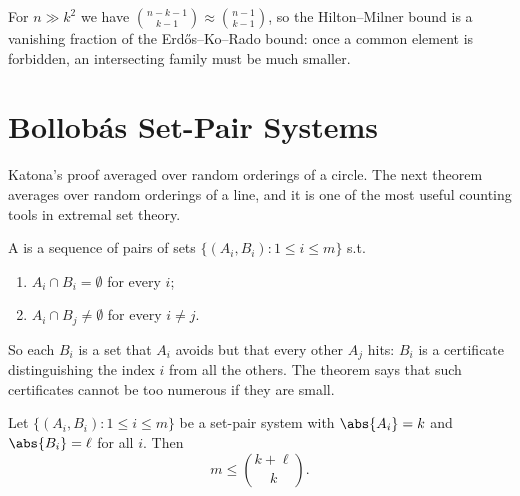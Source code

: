 \begin{remark}
    For \(n \gg k^2\) we have \(\binom{n-k-1}{k-1} \approx \binom{n-1}{k-1}\), so the Hilton--Milner bound is a vanishing fraction of the Erd\H{o}s--Ko--Rado bound: once a common element is forbidden, an intersecting family must be much smaller.
\end{remark}


\section{Bollob\'as Set-Pair Systems}\label{sec:bollobas}

Katona's proof averaged over random orderings of a circle. The next theorem averages over random orderings of a line, and it is one of the most useful counting tools in extremal set theory.

\begin{definition}\label{def:set-pair}
    A  is a sequence of pairs of sets \(\{(A_i, B_i) : 1 \le i \le m\}\) s.t.
    \begin{enumerate}[(1)]
        \item \(A_i \cap B_i = \emptyset\) for every \(i\);
        \item \(A_i \cap B_j \ne \emptyset\) for every \(i \ne j\).
    \end{enumerate}
\end{definition}

So each \(B_i\) is a set that \(A_i\) avoids but that every other \(A_j\) hits: \(B_i\) is a certificate distinguishing the index \(i\) from all the others. The theorem says that such certificates cannot be too numerous if they are small.

\begin{theorem}[Bollob\'as, 1965]\label{thm:bollobas}
    Let \(\{(A_i, B_i) : 1 \le i \le m\}\) be a set-pair system with \(\abs{A_i} = k\) and \(\abs{B_i} = \ell\) for all \(i\). Then
    \[
        m \le \binom{k + \ell}{k}.
    \]
\end{theorem}

